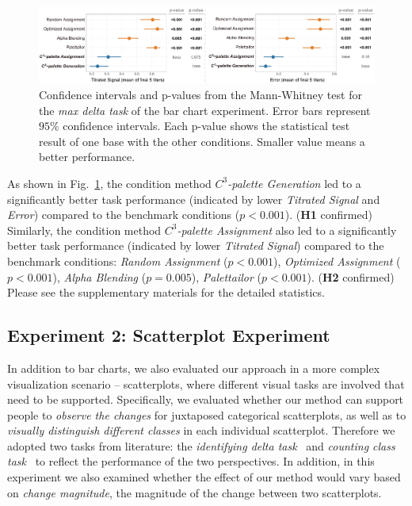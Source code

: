 {\begin{figure}[!tb]
\centering
\includegraphics[width=1\linewidth]{figures/maxdelta-results.pdf}
\caption{Confidence intervals and p-values from the Mann-Whitney test for the \emph{max delta task} of the bar chart experiment. Error bars represent $95\%$ confidence intervals. Each p-value shows the statistical test result of one base with the other conditions. Smaller value means a better performance.}
\vspace*{-3mm}
\label{fig:barResults}
\end{figure}
As shown in Fig.~\ref{fig:barResults}, the condition method \emph{$C^3$-palette Generation} led to a significantly better task performance (indicated by lower \emph{Titrated Signal} and \emph{Error}) compared to the benchmark conditions ($p<0.001$). (\textbf{H1} confirmed)
Similarly, the condition method \emph{$C^3$-palette Assignment} also led to a significantly better task performance (indicated by lower \emph{Titrated Signal}) compared to the benchmark conditions: \emph{Random Assignment} ($p<0.001$), \emph{Optimized Assignment} ($p<0.001$), \emph{Alpha Blending} ($p=0.005$), \emph{Palettailor} ($p<0.001$). (\textbf{H2} confirmed) Please see the supplementary materials for the detailed statistics.




\subsection{Experiment 2: Scatterplot Experiment}
\label{subsec:scatterplotExp}
In addition to bar charts, we also evaluated our approach in a more complex visualization scenario -- scatterplots, where different visual tasks are involved that need to be supported.
Specifically, we evaluated whether our method can support people to \emph{observe the changes} for juxtaposed categorical scatterplots, as well as to \emph{visually distinguish different classes} in each individual scatterplot.
Therefore we adopted two tasks from literature: the \emph{identifying delta task}~\cite{Fukuba2009} and \emph{counting class task}~\cite{Lu21} to reflect the performance of the two perspectives.
In addition, in this experiment we also examined whether the effect of our method would vary based on \emph{change magnitude}, the magnitude of the change between two scatterplots.

}

